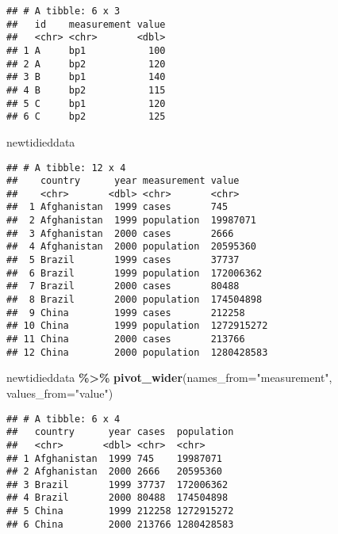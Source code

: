 \documentclass[
]{article}
\newenvironment{Shaded}{\begin{snugshade}}{\end{snugshade}}
\newcommand{\AttributeTok}[1]{\textcolor[rgb]{0.13,0.29,0.53}{#1}}
\newcommand{\FunctionTok}[1]{\textcolor[rgb]{0.13,0.29,0.53}{\textbf{#1}}}
\newcommand{\NormalTok}[1]{#1}
\newcommand{\SpecialCharTok}[1]{\textcolor[rgb]{0.81,0.36,0.00}{\textbf{#1}}}
\newcommand{\StringTok}[1]{\textcolor[rgb]{0.31,0.60,0.02}{#1}}
\begin{document}
\begin{verbatim}
## # A tibble: 6 x 3
##   id    measurement value
##   <chr> <chr>       <dbl>
## 1 A     bp1           100
## 2 A     bp2           120
## 3 B     bp1           140
## 4 B     bp2           115
## 5 C     bp1           120
## 6 C     bp2           125
\end{verbatim}

\begin{Shaded}
\begin{Highlighting}[]
\NormalTok{newtidieddata }
\end{Highlighting}
\end{Shaded}

\begin{verbatim}
## # A tibble: 12 x 4
##    country      year measurement value     
##    <chr>       <dbl> <chr>       <chr>     
##  1 Afghanistan  1999 cases       745       
##  2 Afghanistan  1999 population  19987071  
##  3 Afghanistan  2000 cases       2666      
##  4 Afghanistan  2000 population  20595360  
##  5 Brazil       1999 cases       37737     
##  6 Brazil       1999 population  172006362 
##  7 Brazil       2000 cases       80488     
##  8 Brazil       2000 population  174504898 
##  9 China        1999 cases       212258    
## 10 China        1999 population  1272915272
## 11 China        2000 cases       213766    
## 12 China        2000 population  1280428583
\end{verbatim}

\begin{Shaded}
\begin{Highlighting}[]
\NormalTok{newtidieddata }\SpecialCharTok{\%\textgreater{}\%} 
 \FunctionTok{pivot\_wider}\NormalTok{(}\AttributeTok{names\_from=}\StringTok{"measurement"}\NormalTok{,}
 \AttributeTok{values\_from=}\StringTok{"value"}\NormalTok{)}
\end{Highlighting}
\end{Shaded}

\begin{verbatim}
## # A tibble: 6 x 4
##   country      year cases  population
##   <chr>       <dbl> <chr>  <chr>     
## 1 Afghanistan  1999 745    19987071  
## 2 Afghanistan  2000 2666   20595360  
## 3 Brazil       1999 37737  172006362 
## 4 Brazil       2000 80488  174504898 
## 5 China        1999 212258 1272915272
## 6 China        2000 213766 1280428583
\end{verbatim}
\end{document}
